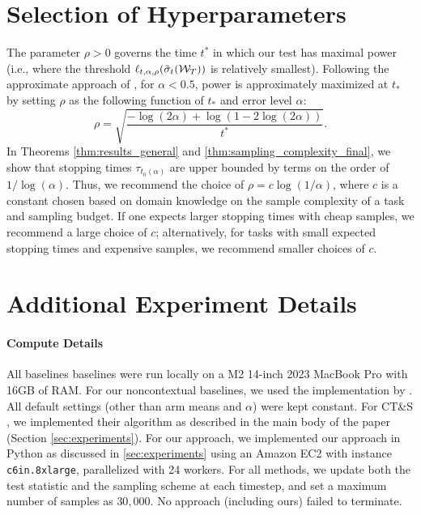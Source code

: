 \documentclass{article}
\begin{document}
\begin{appendices}
\section{Selection of Hyperparameters}\label{app:hyperparameters}

The parameter $\rho > 0$ governs the time $t^*$ in which our test has maximal power (i.e., where the threshold $\ell_{t,\alpha, \rho}(\tilde\sigma_t(\mathcal{W}_T))$ is relatively smallest). Following the approximate approach of \cite{waudbysmith2024timeuniformcentrallimittheory}, for $\alpha < 0.5$, power is approximately maximized at $t_*$ by setting $\rho$ as the following function of $t_*$ and error level $\alpha$:
\begin{equation}
\rho = \sqrt{\frac{-\log(2\alpha) + \log(1-2\log(2\alpha))}{t^*}}.
\end{equation}
In Theorems \ref{thm:results_general} and \ref{thm:sampling_complexity_final}, we show that stopping times $\tau_{t_0(\alpha)}$ are upper bounded by terms on the order of $1/\log(\alpha)$. Thus, we recommend the choice of $\rho = c \log(1/\alpha)$, where $c$ is a constant chosen based on domain knowledge on the sample complexity of a task and sampling budget. If one expects larger stopping times with cheap samples, we recommend a large choice of $c$; alternatively, for tasks with small expected stopping times and expensive samples, we recommend smaller choices of $c$. 


\section{Additional Experiment Details}\label{app:experiments}

\paragraph{Compute Details} All baselines baselines were run locally on a M2 14-inch 2023 MacBook Pro with 16GB of RAM. For our noncontextual baselines, we used the implementation by \cite{bestarmidentification_github}. All default settings (other than arm means and $\alpha$) were kept constant. For CT\&S \citep{kato2024rolecontextualinformationbest}, we implemented their algorithm as described in the main body of the paper (Section \ref{sec:experiments}). For our approach, we implemented our approach in Python as discussed in \ref{sec:experiments} using an Amazon EC2 with instance \texttt{c6in.8xlarge}, parallelized with 24 workers. For all methods, we update both the test statistic and the sampling scheme at each timestep, and set a maximum number of samples as $30,000$. No approach (including ours) failed to terminate. 


\end{appendices}
\end{document}
